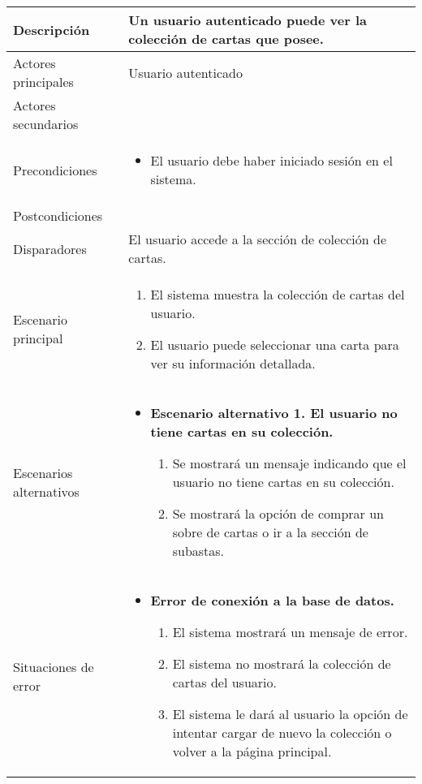 \begin{longtable}{
    >{\columncolor{lightgreen!20}}p{4cm}
    p{12cm}
    }
    \midrule
    Descripción & Un usuario autenticado puede ver la colección de cartas que posee. \\
    \midrule
    Actores principales & Usuario autenticado \\
    \midrule
    Actores secundarios &  \\
    \midrule
    Precondiciones & \begin{itemize}[nosep,leftmargin=*]
        \item El usuario debe haber iniciado sesión en el sistema.
    \end{itemize} \\
    \midrule
    Postcondiciones & \\
    \midrule
    Disparadores & El usuario accede a la sección de colección de cartas. \\
    \midrule
    Escenario principal & \begin{enumerate}[nosep,leftmargin=*]
        \item El sistema muestra la colección de cartas del usuario.
        \item El usuario puede seleccionar una carta para ver su información detallada.
    \end{enumerate} \\
    \midrule
    Escenarios alternativos & 
    \begin{itemize}[nosep,leftmargin=*]
        \item \textbf{Escenario alternativo 1. El usuario no tiene cartas en su colección.}
        \begin{enumerate}[nosep,leftmargin=*]
            \item Se mostrará un mensaje indicando que el usuario no tiene cartas en su colección.
            \item Se mostrará la opción de comprar un sobre de cartas o ir a la sección de subastas.
        \end{enumerate}
    \end{itemize} \\
    \midrule
    Situaciones de error & 
    \begin{itemize}[nosep,leftmargin=*]
        \item \textbf{Error de conexión a la base de datos.}
        \begin{enumerate}[nosep,leftmargin=*]
            \item El sistema mostrará un mensaje de error.
            \item El sistema no mostrará la colección de cartas del usuario.
            \item El sistema le dará al usuario la opción de intentar cargar de nuevo la colección o volver a la página principal.
        \end{enumerate}
    \end{itemize} \\
\end{longtable}


